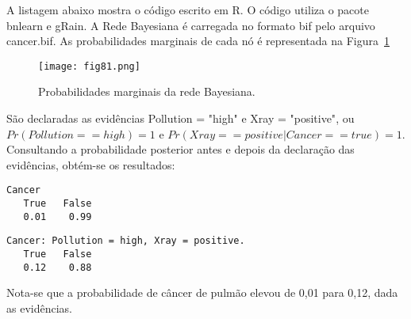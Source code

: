 A listagem abaixo mostra o código escrito em R. O código utiliza o pacote \textsf{bnlearn} e \textsf{gRain}. A Rede Bayesiana é carregada no formato \textsf{bif} pelo arquivo \textsf{cancer.bif}. As probabilidades marginais de cada nó é representada na Figura~\ref{fig:fig81}

\begin{figure}[t]
    \texttt{[image: fig81.png]}
    \centering
    \caption{Probabilidades marginais da rede Bayesiana.}
    \label{fig:fig81}
\end{figure}

São declaradas as evidências \textsf{Pollution = "high"} e \textsf{Xray = "positive"}, ou $Pr(Pollution==high) = 1$ e $Pr(Xray==positive | Cancer==true) = 1$. Consultando a probabilidade posterior antes e depois da declaração das evidências, obtém-se os resultados:

\begin{verbatim}
Cancer
   True   False 
   0.01    0.99 
\end{verbatim}

\begin{verbatim}
Cancer: Pollution = high, Xray = positive.
   True   False 
   0.12    0.88 
\end{verbatim}

Nota-se que a probabilidade de câncer de pulmão elevou de 0,01 para 0,12, dada as evidências.

